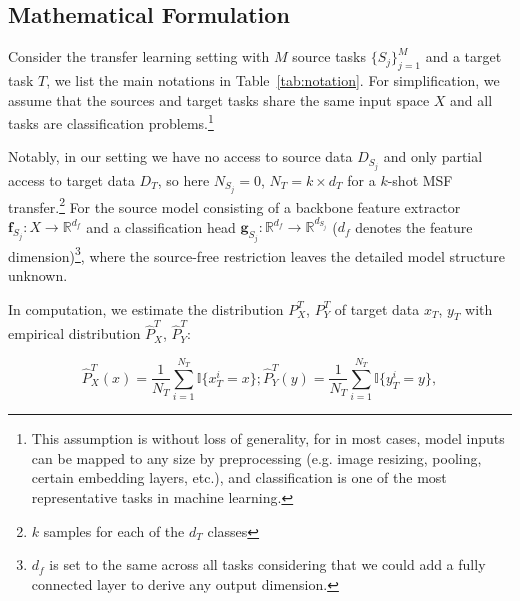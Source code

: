 \documentclass[letterpaper]{article} %
\begin{document}
\subsection{Mathematical Formulation}


Consider the transfer learning setting with $M$ source tasks $\{S_j\}_{j=1}^M$ and a target task $T$, we list the main notations in Table~\ref{tab:notation}.  For simplification, we assume that the sources and target tasks share the same input space $X$ and all tasks are classification problems.\footnote{This assumption is without loss of generality, for in most cases,
model inputs can be mapped to any size by preprocessing (e.g. image resizing, pooling, certain embedding layers, etc.),
and classification is one of the most representative tasks in machine learning.}

Notably, in our setting we have no access to source data $D_{S_j}$ and only partial access to target data $D_T$, so here $N_{S_j} = 0$, $N_T = k \times d_T$ for a $k$-shot MSF transfer.\footnote{$k$ samples for each of the $d_T$ classes}
For the source model consisting of a backbone feature extractor $\boldsymbol{f}_{S_j}: X \to \mathbb{R}^{d_f}$ and a classification head $\boldsymbol{g}_{S_j}: \mathbb{R}^{d_f} \to \mathbb{R}^{d_{S_j}}$ ($d_f$ denotes the feature dimension)\footnote{$d_f$ is set to the same across all tasks considering that we could add a fully connected layer to derive any output dimension.}, where the source-free restriction leaves the detailed model structure unknown.



In computation, we estimate the distribution $P^T_{X}$, $P^T_{Y}$ of target data $x_T$, $y_T$ with empirical distribution $\hat P^T_{X}$, $\hat P^T_{Y}$:

\begin{equation}
\hat P_{X}^T (x)= \frac{1}{N_T}\sum_{i=1}^{N_T}\mathbb{I}\{x_T^i=x\}; \hat P_{Y}^T (y)= \frac{1}{N_T}\sum_{i=1}^{N_T}\mathbb{I}\{y_T^i=y\},
\label{py}
\end{equation}
\end{document}
